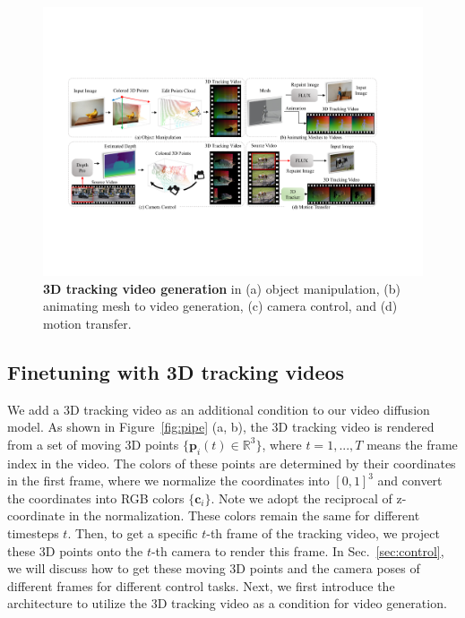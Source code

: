 \begin{figure}
    \centering
    \includegraphics[width=\textwidth]{pictures/4taskpipe.pdf}
    \caption{\textbf{3D tracking video generation} in (a) object manipulation, (b) animating mesh to video generation, (c) camera control, and (d) motion transfer.}
    \label{fig:pipe-tasks}
\end{figure}
\subsection{Finetuning with 3D tracking videos}
\label{sec:tracking}

We add a 3D tracking video as an additional condition to our video diffusion model. As shown in Figure~\ref{fig:pipe} (a, b), the 3D tracking video is rendered from a set of moving 3D points $\{\mathbf{p}_i(t)\in\mathbb{R}^3\}$, where $t=1,...,T$ means the frame index in the video. The colors of these points are determined by their coordinates in the first frame, where we normalize the coordinates into $[0,1]^3$ and convert the coordinates into RGB colors $\{\mathbf{c}_i\}$. 
Note we adopt the reciprocal of z-coordinate in the normalization.
These colors remain the same for different timesteps $t$. Then, to get a specific $t$-th frame of the tracking video, we project these 3D points onto the $t$-th camera to render this frame. In Sec.~\ref{sec:control}, we will discuss how to get these moving 3D points and the camera poses of different frames for different control tasks. Next, we first introduce the architecture to utilize the 3D tracking video as a condition for video generation.

